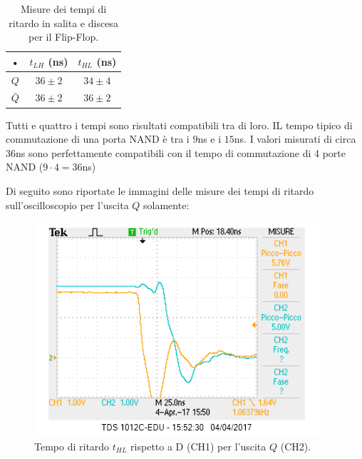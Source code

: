 \documentclass[10pt,a4paper]{article}
\begin{document}
\begin{table}[!htb]
\centering
\begin{tabular}{|c|c|c|}
\hline 
• & $t_{LH}$ (ns) & $t_{HL}$ (ns)\\
\hline
$Q$ & $36 \pm 2$ & $34 \pm 4$\\
\hline
$\bar{Q}$ & $36 \pm 2$ & $36 \pm 2$\\
\hline
\end{tabular}
\caption{Misure dei tempi di ritardo in salita e discesa per il Flip-Flop.\label{ritardo}}
\end{table}

Tutti e quattro i tempi sono risultati compatibili tra di loro. IL tempo tipico di commutazione di una porta NAND è tra i $9$ns e i $15$ns. I valori misurati di circa $36$ns sono perfettamente compatibili con il tempo di commutazione di 4 porte NAND ($9 \cdot 4 = 36$ns)%

Di seguito sono riportate le immagini delle misure dei tempi di ritardo sull'oscilloscopio per l'uscita $Q$ solamente:\\

\begin{figure}
\centering
\includegraphics[scale=1.0]{tphlQ.png}
\caption{Tempo di ritardo  $t_{HL}$ rispetto a D (CH1) per l'uscita $Q$ (CH2).\label{q1}}
\end{figure}
\end{document}
